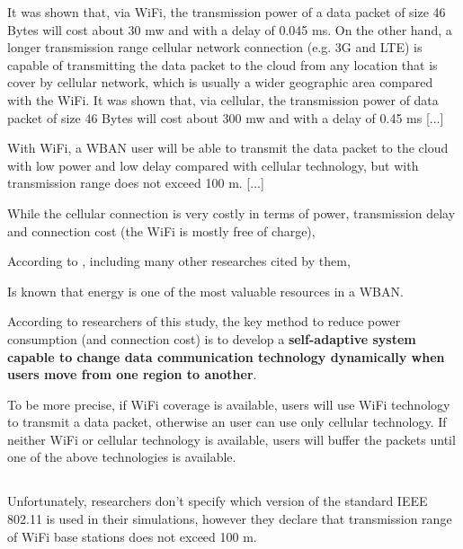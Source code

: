 \documentclass[sigchi]{acmart}
\begin{document}
\begin{quoting}[font=itshape, begintext={``}, endtext={''\cite[par.~3.1]{MSAReport}}]
It was shown that, via WiFi, the transmission power of a data packet of size 46 Bytes will cost about 30 mw and with a delay of 0.045 ms. On the other hand, a longer transmission range cellular network connection (e.g. 3G and LTE) is capable of transmitting the data packet to the cloud from any location that is cover by cellular network, which is usually a wider geographic area compared with the WiFi. It was shown that, via cellular, the transmission power of data packet of size 46 Bytes will cost about 300 mw and with a delay of 0.45 ms [...]


With WiFi, a WBAN user will be able to transmit the data packet to the cloud with low power and low delay compared with cellular technology, but with transmission range does not exceed 100 m. [...]


While the cellular connection is very costly in terms of power, transmission delay and connection cost (the WiFi is mostly free of charge),
\end{quoting}

\vspace{0.3cm}

According to \citet{MSAReport}, including many other researches cited by them, 

Is known that energy is one of the most valuable resources in a WBAN.

According to researchers of this study, the key method to reduce power consumption (and connection cost) is to develop a \textbf{self-adaptive system capable to change data communication technology dynamically when users move from one region to another}. 

To be more precise, if WiFi coverage is available, users will use WiFi technology to transmit a data packet, otherwise an user can use only cellular technology. If neither WiFi or cellular technology is available, users will buffer the packets until one of the above technologies is available.\cite[par.~3.1]{MSAReport}


\subsection{}

Unfortunately, researchers don't specify which version of the standard IEEE 802.11 is used in their simulations, however they declare that transmission range of WiFi base stations does not exceed 100 m. 
\end{document}

